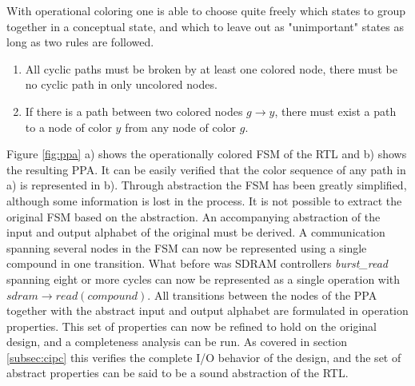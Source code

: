 With operational coloring one is able to choose quite freely which states to group together in a conceptual state, and which to leave out as "unimportant" states as long as two rules are followed. 
\begin{enumerate}
 \item All cyclic paths must be broken by at least one colored node, there must be no cyclic path in only uncolored nodes. 
 \item If there is a path between two colored nodes $g\rightarrow y$, there must exist a path to a node of color $y$ from any node of color $g$. 
\end{enumerate} 

Figure \ref{fig:ppa} a) shows the operationally colored FSM of the RTL and b) shows the resulting PPA. It can be easily verified that the color sequence of any path in a) is represented in b). Through abstraction the FSM has been greatly simplified, although some information is lost in the process. It is not possible to extract the original FSM based on the abstraction. An accompanying abstraction of the input and output alphabet of the original must be derived. A communication spanning several nodes in the FSM can now be represented using a single compound in one transition. What before was SDRAM controllers \textit{burst\_read} spanning eight or more cycles can now be represented as a single operation with $sdram\rightarrow read(compound)$. All transitions between the nodes of the PPA together with the abstract input and output alphabet are formulated in operation properties. This set of properties can now be refined to hold on the original design, and a completeness analysis can be run. As covered in section \ref{subsec:cipc} this verifies the complete I/O behavior of the design, and the set of abstract properties can be said to be a sound abstraction of the RTL.  



